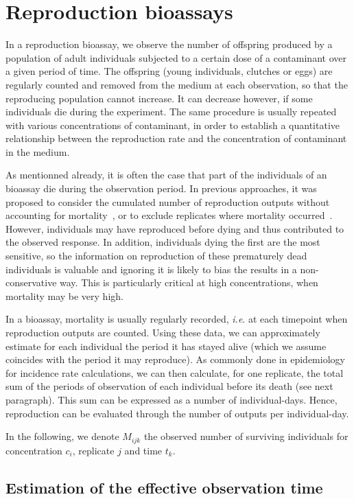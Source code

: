 \documentclass{article}
\begin{document}
\section{Reproduction bioassays}

In a reproduction bioassay, we observe the number of offspring
produced by a population of adult individuals subjected to a certain
dose of a contaminant over a given period of time. The offspring
(young individuals, clutches or eggs) are regularly counted and
removed from the medium at each observation, so that the reproducing
population cannot increase. It can decrease however, if some
individuals die during the experiment. The same procedure is usually
repeated with various concentrations of contaminant, in order to
establish a quantitative relationship between the reproduction rate
and the concentration of contaminant in the medium.

As mentionned already, it is often the case that part of the
individuals of an bioassay die during the observation period. In
previous approaches, it was proposed to consider the cumulated number
of reproduction outputs without accounting for
mortality~\cite{OECD2004,OECD2008}, or to exclude replicates where
mortality occurred~\cite{OECD2012}.  However, individuals may have
reproduced before dying and thus contributed to the observed
response. In addition, individuals dying the first are the most
sensitive, so the information on reproduction of these prematurely
dead individuals is valuable and ignoring it is likely to bias the
results in a non-conservative way. This is particularly critical at
high concentrations, when mortality may be very high.

In a bioassay, mortality is usually regularly recorded, \textit{i.e}.
at each timepoint when reproduction outputs are counted.  Using these
data, we can approximately estimate for each individual the period it
has stayed alive (which we assume coincides with the period it may
reproduce).  As commonly done in epidemiology for incidence rate
calculations, we can then calculate, for one replicate, the total sum
of the periods of observation of each individual before its death (see
next paragraph). This sum can be expressed as a number of
individual-days. Hence, reproduction can be evaluated through the
number of outputs per individual-day.

In the following, we denote $M_{ijk}$ the observed number of surviving
individuals for concentration $c_i$, replicate $j$ and time $t_k$.

\subsection{Estimation of the effective observation time}
\end{document}
